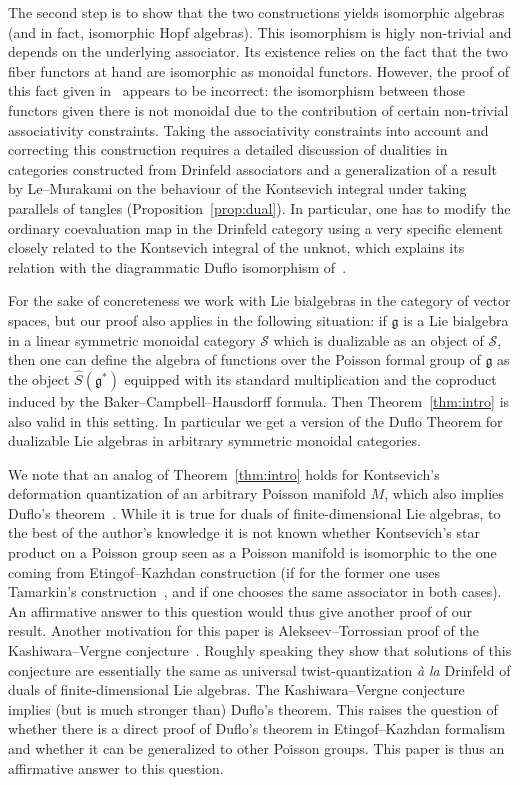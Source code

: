 \documentclass[pdftex]{sigma}
\numberwithin{equation}{section}
\newcommand{\mf}[1]{\mathfrak{#1}}
\newcommand{\cS}{\mathcal {S}}
\theoremstyle{definition}
\begin{document}
The second step is to show that the two constructions yields isomorphic algebras (and in fact, isomorphic Hopf algebras). This isomorphism is higly non-trivial and depends on the underlying associator. Its existence relies on the fact that the two f\/iber functors at hand are isomorphic as monoidal functors. However, the proof of this fact given in~\cite{Etingof1996} appears to be incorrect: the isomorphism between those functors given there is not monoidal due to the contribution of certain non-trivial associativity constraints. Taking the associativity constraints into account and correcting this construction requires a detailed discussion of dualities in categories constructed from Drinfeld associators and a generalization of a result by Le--Murakami on the behaviour of the Kontsevich integral under taking parallels of tangles (Proposition~\ref{prop:dual}). In particular, one has to modify the ordinary coevaluation map in the Drinfeld category using a very specif\/ic element closely related to the Kontsevich integral of the unknot, which explains its relation with the diagrammatic Duf\/lo isomorphism of~\cite{MR1988280}.

For the sake of concreteness we work with Lie bialgebras in the category of vector spaces, but our proof also applies in the following situation: if $\mf g$ is a Lie bialgebra in a linear symmetric monoidal category $\cS$ which is dualizable as an object of $\cS$, then one can def\/ine the algebra of functions over the Poisson formal group of $\mf g$ as the object $\widehat{S}(\mf g^*)$ equipped with its standard multiplication and the coproduct induced by the Baker--Campbell--Hausdorf\/f formula. Then Theorem~\ref{thm:intro} is also valid in this setting. In particular we get a version of the Duf\/lo Theorem for dualizable Lie algebras in arbitrary symmetric monoidal categories.

We note that an analog of Theorem~\ref{thm:intro} holds for Kontsevich's deformation quantization of an arbitrary Poisson manifold $M$, which also implies Duf\/lo's theorem~\cite{Cattaneo2002,Kontsevich2003,Manchon2003}. While it is true for duals of f\/inite-dimensional Lie algebras, to the best of the author's knowledge it is not known whether Kontsevich's star product on a Poisson group seen as a Poisson manifold is isomorphic to the one coming from Etingof--Kazhdan construction (if for the former one uses Tamarkin's construction~\cite{Tamarkin1998, Tamarkin1999}, and if one chooses the same associator in both cases). An af\/f\/irmative answer to this question would thus give another proof of our result. Another motivation for this paper is Alekseev--Torrossian proof of the Kashiwara--Vergne conjecture~\cite{Alekseev2012}. Roughly speaking they show that solutions of this conjecture are essentially the same as universal twist-quantization \emph{\`a la} Drinfeld of duals of f\/inite-dimensional Lie algebras. The Kashiwara--Vergne conjecture implies (but is much stronger than) Duf\/lo's theorem. This raises the question of whether there is a direct proof of Duf\/lo's theorem in Etingof--Kazhdan formalism and whether it can be generalized to other Poisson groups. This paper is thus an af\/f\/irmative answer to this question.
\end{document}
